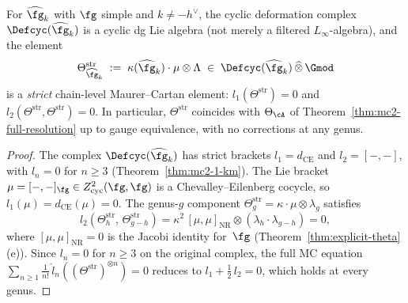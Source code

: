 \begin{theorem}\label{thm:km-strictification}
For $\widehat{\fg}_k$ with $\fg$ simple and $k \neq -h^\vee$,
the cyclic deformation complex $\Defcyc(\widehat{\fg}_k)$ is a
cyclic dg Lie algebra \textup{(}not merely a filtered
$L_\infty$-algebra\textup{)}, and the element
\begin{equation}\label{eq:theta-strict}
\Theta^{\mathrm{str}}_{\widehat{\fg}_k}
\;:=\;
\kappa(\widehat{\fg}_k) \cdot \mu \otimes \Lambda
\;\in\;
\Defcyc(\widehat{\fg}_k) \,\widehat{\otimes}\, \Gmod
\end{equation}
is a \emph{strict} chain-level Maurer--Cartan element:
$l_1(\Theta^{\mathrm{str}}) = 0$ and
$l_2(\Theta^{\mathrm{str}}, \Theta^{\mathrm{str}}) = 0$.
In particular, $\Theta^{\mathrm{str}}$ coincides with
$\Theta_{\cA}$ of
Theorem~\textup{\ref{thm:mc2-full-resolution}} up to gauge
equivalence, with no corrections at any genus.
\end{theorem}

\begin{proof}
The complex $\Defcyc(\widehat{\fg}_k)$
has strict brackets
$l_1 = d_{\mathrm{CE}}$ and $l_2 = [-,-]$, with
$l_n = 0$ for $n \geq 3$
(Theorem~\ref{thm:mc2-1-km}).
The Lie bracket
$\mu = [-,-]_\fg \in Z^2_{\mathrm{cyc}}(\fg,\fg)$
is a Chevalley--Eilenberg cocycle, so
$l_1(\mu) = d_{\mathrm{CE}}(\mu) = 0$.
The genus-$g$ component
$\Theta^{\mathrm{str}}_g = \kappa \cdot \mu \otimes
\lambda_g$ satisfies
\[
l_2(\Theta^{\mathrm{str}}_h,\,\Theta^{\mathrm{str}}_{g-h})
= \kappa^2\,[\mu,\mu]_{\mathrm{NR}}
  \otimes (\lambda_h \cdot \lambda_{g-h})
= 0,
\]
where $[\mu,\mu]_{\mathrm{NR}} = 0$ is the Jacobi identity
for~$\fg$
(Theorem~\ref{thm:explicit-theta}(e)).
Since $l_n = 0$ for $n \geq 3$ on the original complex,
the full MC equation
$\sum_{n \geq 1} \frac{1}{n!}\,
\hat{l}_n((\Theta^{\mathrm{str}})^{\otimes n}) = 0$
reduces to $l_1 + \frac{1}{2}\,l_2 = 0$, which holds at
every genus.
\end{proof}

